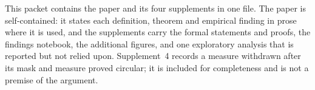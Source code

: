 \vspace{1em}
\noindent This packet contains the paper and its four supplements in one file.
The paper is self-contained: it states each definition, theorem and empirical
finding in prose where it is used, and the supplements carry the formal
statements and proofs, the findings notebook, the additional figures, and one
exploratory analysis that is reported but not relied upon. Supplement~4 records
a measure withdrawn after its mask and measure proved circular; it is included
for completeness and is not a premise of the argument.

\vspace{1.5em}
\tableofcontents
\clearpage



%
\newcommand{\packetsuppstart}[1]{%
  \clearpage
  \setcounter{figure}{0}\setcounter{table}{0}%
  \renewcommand{\thefigure}{S#1.\arabic{figure}}%
  \renewcommand{\thetable}{S#1.\arabic{table}}%
  \phantomsection}
\newcommand{\packetsupp}[2]{%
  \packetsuppstart{#1}%
  \part*{Supplement #1: #2}%
  \addcontentsline{toc}{part}{Supplement #1: #2}}
\newcommand{\packetsuppself}[2]{%
  \packetsuppstart{#1}%
  \addcontentsline{toc}{part}{Supplement #1: #2}}

